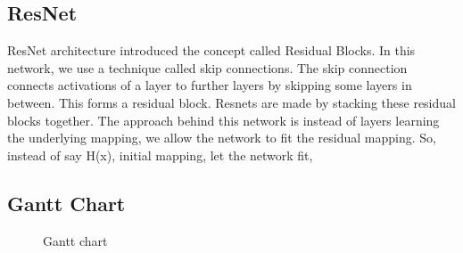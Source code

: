         \subsection*{ResNet}
        ResNet architecture introduced the concept called Residual Blocks. In this network, we use a technique called skip connections. The skip connection connects activations of a  layer to further layers by skipping some layers in between. This forms a residual block. Resnets are made by stacking these residual blocks together. 
        The approach behind this network is instead of layers learning the underlying mapping, we allow the network to fit the residual mapping. So, instead of say H(x), initial mapping, let the network fit,

        \begin{figure}[hbt!]
        \end{figure}


        \newpage
        \justifying
        \subsection{Gantt Chart}
            \begin{figure}[hbt!]
                \caption{Gantt chart}
            \end{figure}

